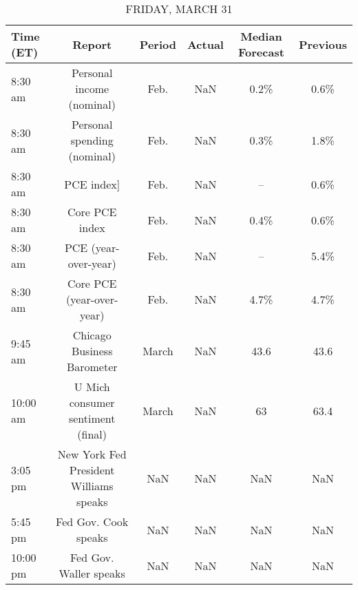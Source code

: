 \documentclass{article}%
\begin{document}
\begin{table}[htbp]%
\caption{FRIDAY, MARCH 31}%
\centering%
\begin{adjustbox}{width=1\textwidth}%
\begin{tabular}{lccccc}
\toprule
Time (ET) &                                 Report & Period & Actual & Median Forecast & Previous \\
\midrule
  8:30 am &              Personal income (nominal) &   Feb. &    NaN &            0.2\% &     0.6\% \\
  8:30 am &            Personal spending (nominal) &   Feb. &    NaN &            0.3\% &     1.8\% \\
  8:30 am &                             PCE index] &   Feb. &    NaN &              -- &     0.6\% \\
  8:30 am &                         Core PCE index &   Feb. &    NaN &            0.4\% &     0.6\% \\
  8:30 am &                   PCE (year-over-year) &   Feb. &    NaN &              -- &     5.4\% \\
  8:30 am &              Core PCE (year-over-year) &   Feb. &    NaN &            4.7\% &     4.7\% \\
  9:45 am &             Chicago Business Barometer &  March &    NaN &            43.6 &     43.6 \\
 10:00 am &      U Mich consumer sentiment (final) &  March &    NaN &              63 &     63.4 \\
  3:05 pm & New York Fed President Williams speaks &    NaN &    NaN &             NaN &      NaN \\
  5:45 pm &                   Fed Gov. Cook speaks &    NaN &    NaN &             NaN &      NaN \\
 10:00 pm &                 Fed Gov. Waller speaks &    NaN &    NaN &             NaN &      NaN \\
\bottomrule
\end{tabular}
%
\end{adjustbox}%
\end{table}
\end{document}
